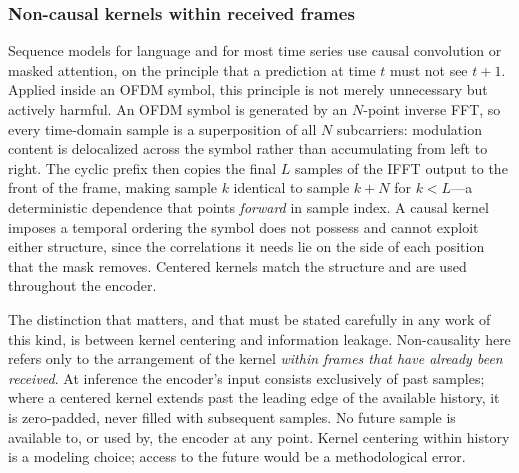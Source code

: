 \documentclass[lettersize,journal]{IEEEtran}
\begin{document}
\subsubsection{\textbf{Non-causal kernels within received frames}}
Sequence models for language and for most time series use causal convolution or
masked attention, on the principle that a prediction at time $t$ must not see
$t+1$. Applied inside an OFDM symbol, this principle is not merely unnecessary
but actively harmful. An OFDM symbol is generated by an $N$-point inverse FFT,
so every time-domain sample is a superposition of all $N$ subcarriers:
modulation content is delocalized across the symbol rather than accumulating
from left to right. The cyclic prefix then copies the final $L$ samples of the
IFFT output to the front of the frame, making sample $k$ identical to sample
$k+N$ for $k < L$---a deterministic dependence that points \emph{forward} in
sample index. A causal kernel imposes a temporal ordering the symbol does not
possess and cannot exploit either structure, since the correlations it needs lie
on the side of each position that the mask removes. Centered kernels match the
structure and are used throughout the encoder.

The distinction that matters, and that must be stated carefully in any work of
this kind, is between kernel centering and information leakage. Non-causality
here refers only to the arrangement of the kernel \emph{within frames that have
already been received}. At inference the encoder's input consists exclusively of
past samples; where a centered kernel extends past the leading edge of the
available history, it is zero-padded, never filled with subsequent samples. No
future sample is available to, or used by, the encoder at any point. Kernel
centering within history is a modeling choice; access to the future would be a
methodological error.

\end{document}
